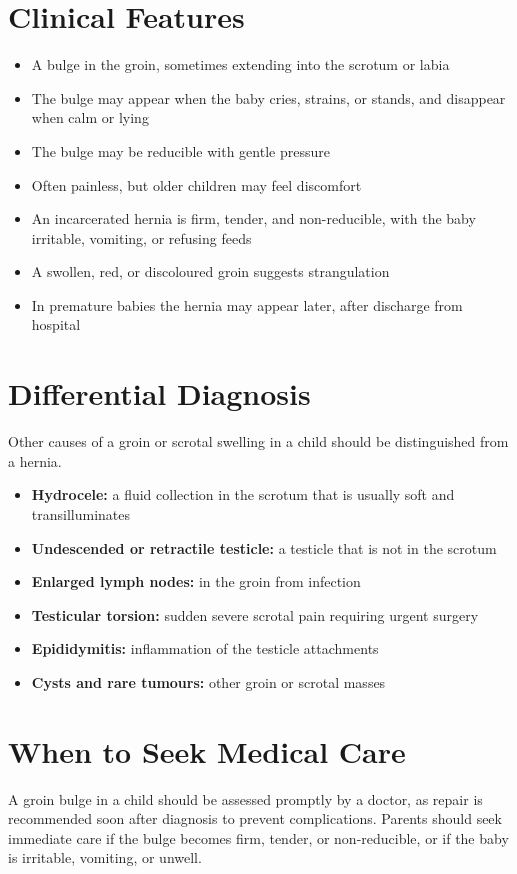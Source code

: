 \section*{Clinical Features}
\begin{itemize}
    \item A bulge in the groin, sometimes extending into the scrotum or labia
    \item The bulge may appear when the baby cries, strains, or stands, and disappear when calm or lying
    \item The bulge may be reducible with gentle pressure
    \item Often painless, but older children may feel discomfort
    \item An incarcerated hernia is firm, tender, and non-reducible, with the baby irritable, vomiting, or refusing feeds
    \item A swollen, red, or discoloured groin suggests strangulation
    \item In premature babies the hernia may appear later, after discharge from hospital
\end{itemize}

\section*{Differential Diagnosis}
Other causes of a groin or scrotal swelling in a child should be distinguished from a hernia.
\begin{itemize}
    \item \textbf{Hydrocele:} a fluid collection in the scrotum that is usually soft and transilluminates
    \item \textbf{Undescended or retractile testicle:} a testicle that is not in the scrotum
    \item \textbf{Enlarged lymph nodes:} in the groin from infection
    \item \textbf{Testicular torsion:} sudden severe scrotal pain requiring urgent surgery
    \item \textbf{Epididymitis:} inflammation of the testicle attachments
    \item \textbf{Cysts and rare tumours:} other groin or scrotal masses
\end{itemize}

\section*{When to Seek Medical Care}
A groin bulge in a child should be assessed promptly by a doctor, as repair is recommended soon after diagnosis to prevent complications. Parents should seek immediate care if the bulge becomes firm, tender, or non-reducible, or if the baby is irritable, vomiting, or unwell.

